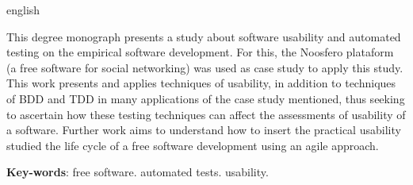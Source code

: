 \begin{resumo}[Abstract]
  \begin{otherlanguage*}{english}  
  
This degree monograph presents a study about software usability and automated testing on the empirical software development. For this, the Noosfero plataform (a free software for social networking) was used as case study to apply this study. This work presents and applies techniques of usability, in addition to techniques of BDD and TDD in many applications of the case study mentioned, thus seeking to ascertain how these testing techniques can affect the assessments of usability of a software. Further work aims to understand how to insert the practical usability studied the life cycle of a free software development using an agile approach.

 
   \vspace{\onelineskip}
 
  \noindent 
  \textbf{Key-words}: free software. automated tests. usability.
  \end{otherlanguage*}
\end{resumo}
